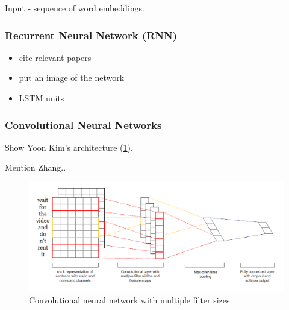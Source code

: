 Input - sequence of word embeddings.

\subsubsection{Recurrent Neural Network (RNN)}
\begin{itemize}
    \item cite relevant papers
    \item put an image of the network
    \item LSTM units
\end{itemize}

\subsubsection{Convolutional Neural Networks}
Show Yoon Kim's\cite{yoon_kim} architecture (\cref{fig:cnn_kim}).


Mention Zhang.\cite{cnn_zhang}.

\begin{figure}[h]
	\centering
	\includegraphics[height=0.2\textheight]{img/cnn_kim}
	\caption{Convolutional neural network with multiple filter sizes\cite{yoon_kim}}
	\label{fig:cnn_kim}
\end{figure}

